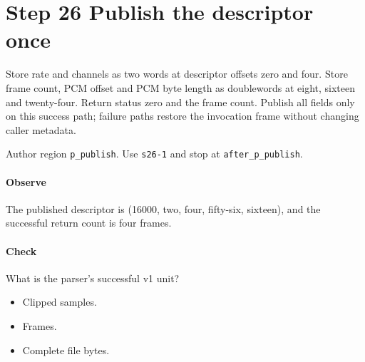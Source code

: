 \section{Step 26 Publish the descriptor once}\label{pcm-wav-s26}
Store rate and channels as two words at descriptor offsets zero and four. Store frame count, PCM offset and PCM byte length as doublewords at eight, sixteen and twenty-four. Return status zero and the frame count. Publish all fields only on this success path; failure paths restore the invocation frame without changing caller metadata.

Author region \texttt{p\_publish}. Use \texttt{s26-1} and stop at \texttt{after\_p\_publish}.

\paragraph{Observe} The published descriptor is (16000, two, four, fifty-six, sixteen), and the successful return count is four frames.

\paragraph{Check} What is the parser's successful v1 unit?
\begin{itemize}
  \item[A.] Clipped samples.
  \item[B.] Frames.
  \item[C.] Complete file bytes.
\end{itemize}

